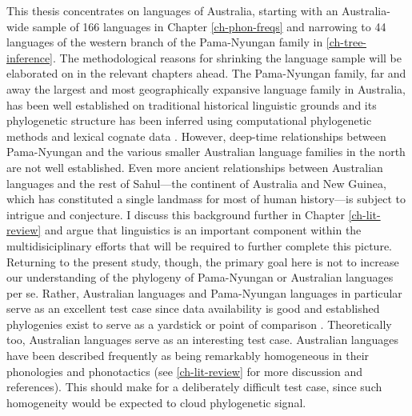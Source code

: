This thesis concentrates on languages of Australia, starting with an Australia-wide sample of 166 languages in Chapter \ref{ch-phon-freqs} and narrowing to 44 languages of the western branch of the Pama-Nyungan family in \ref{ch-tree-inference}. The methodological reasons for shrinking the language sample will be elaborated on in the relevant chapters ahead. The Pama-Nyungan family, far and away the largest and most geographically expansive language family in Australia, has been well established on traditional historical linguistic grounds and its phylogenetic structure has been inferred using computational phylogenetic methods and lexical cognate data \autocites{bowern_computational_2012}{bouckaert_origin_2018}. However, deep-time relationships between Pama-Nyungan and the various smaller Australian language families in the north are not well established. Even more ancient relationships between Australian languages and the rest of Sahul---the continent of Australia and New Guinea, which has constituted a single landmass for most of human history---is subject to intrigue and conjecture. I discuss this background further in Chapter \ref{ch-lit-review} and argue that linguistics is an important component within the multidisiciplinary efforts that will be required to further complete this picture. Returning to the present study, though, the primary goal here is not to increase our understanding of the phylogeny of Pama-Nyungan or Australian languages per se. Rather, Australian languages and Pama-Nyungan languages in particular serve as an excellent test case since data availability is good \autocites[lexical data in][]{bowern_chirila:_2016}{round_ausphon-lexicon_2017} and established phylogenies exist to serve as a yardstick or point of comparison \autocites{bowern_computational_2012}{bouckaert_origin_2018}. Theoretically too, Australian languages serve as an interesting test case. Australian languages have been described frequently as being remarkably homogeneous in their phonologies and phonotactics \autocites{round_segment_2021}{round_phonotactics_2021} (see \ref{ch-lit-review} for more discussion and references). This should make for a deliberately difficult test case, since such homogeneity would be expected to cloud phylogenetic signal.

